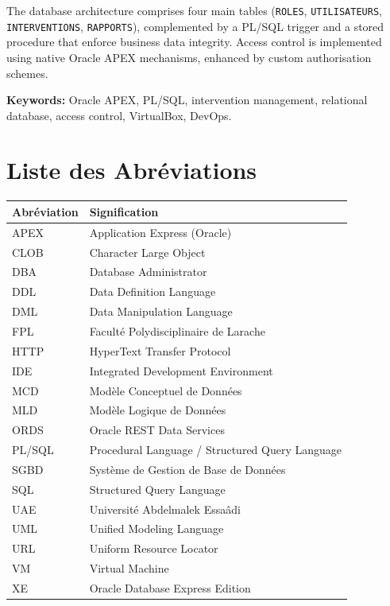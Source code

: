 \documentclass[12pt,a4paper,oneside]{report}
\begin{document}
The database architecture comprises four main tables (\texttt{ROLES}, \texttt{UTILISATEURS}, \texttt{INTERVENTIONS}, \texttt{RAPPORTS}), complemented by a PL/SQL trigger and a stored procedure that enforce business data integrity. Access control is implemented using native Oracle APEX mechanisms, enhanced by custom authorisation schemes.

\medskip
\textbf{Keywords:} Oracle APEX, PL/SQL, intervention management, relational database, access control, VirtualBox, DevOps.

\clearpage

\tableofcontents
\clearpage

\listoffigures
{}
\clearpage

\listoftables
{}
\clearpage

\chapter*{Liste des Abréviations}
\thispagestyle{fancy}

\begin{tabular}{@{}p{3.5cm}l@{}}
  \toprule
  \textbf{Abréviation} & \textbf{Signification} \\
  \midrule
  APEX   & Application Express (Oracle) \\
  CLOB   & Character Large Object \\
  DBA    & Database Administrator \\
  DDL    & Data Definition Language \\
  DML    & Data Manipulation Language \\
  FPL    & Faculté Polydisciplinaire de Larache \\
  HTTP   & HyperText Transfer Protocol \\
  IDE    & Integrated Development Environment \\
  MCD    & Modèle Conceptuel de Données \\
  MLD    & Modèle Logique de Données \\
  ORDS   & Oracle REST Data Services \\
  PL/SQL & Procedural Language / Structured Query Language \\
  SGBD   & Système de Gestion de Base de Données \\
  SQL    & Structured Query Language \\
  UAE    & Université Abdelmalek Essaâdi \\
  UML    & Unified Modeling Language \\
  URL    & Uniform Resource Locator \\
  VM     & Virtual Machine \\
  XE     & Oracle Database Express Edition \\
  \bottomrule
\end{tabular}
\end{document}
